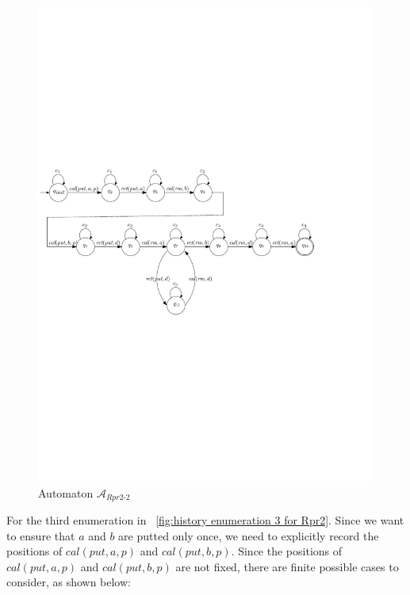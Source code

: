 \begin{figure}[htbp]
  \centering
  \includegraphics[width=0.8 \textwidth]{PIC_AUTO_Rpr2_2.pdf}
  \caption{Automaton $\mathcal{A}_{\textit{Rpr2-2}}$}
  \label{fig:automata for second enumeration of Rpr2}
\end{figure}

For the third enumeration in \figurename~\ref{fig:history enumeration 3 for Rpr2}. Since we want to ensure that $a$ and $b$ are putted only once, we need to explicitly record the positions of $\textit{cal}(\textit{put},a,p)$ and $\textit{cal}(\textit{put},b,p)$. Since the positions of $\textit{cal}(\textit{put},a,p)$ and $\textit{cal}(\textit{put},b,p)$ are not fixed, there are finite possible cases to consider, as shown below:

